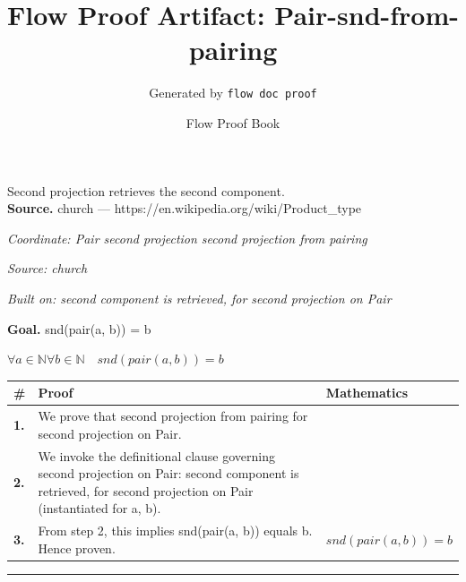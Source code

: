 \documentclass[11pt]{article}
\title{Flow Proof Artifact: Pair-snd-from-pairing}
\author{Generated by \texttt{flow doc proof}}
\date{Flow Proof Book}
\theoremstyle{definition}
\begin{document}
\maketitle
Second projection retrieves the second component.\\[0.5em]
\textbf{Source.} church — https://en.wikipedia.org/wiki/Product\_type\\[0.5em]
\bigskip
{}\par
\smallskip\noindent\textit{Coordinate: Pair \cdot second projection \cdot second projection from pairing}\par
\smallskip\noindent\textit{Source: church}\par
\smallskip\noindent\textit{Built on: second component is retrieved, for second projection on Pair}\par
\medskip
\noindent\textbf{Goal.} snd(pair(a, b)) = b\par
\noindent$\displaystyle \forall a \in \mathbb{N} \forall b \in \mathbb{N}\quad snd(pair(a, b)) = b$\par
\medskip
\noindent
\begin{tabular}{@{} >{\raggedright\arraybackslash}p{} >{\raggedright\arraybackslash}p{} >{\raggedleft\arraybackslash}p{} @{}}
\textbf{\#} & \textbf{Proof} & \textbf{Mathematics} \\
\midrule
\textbf{1.} & We prove that second projection from pairing for second projection on Pair. & \\[0.45em]
\textbf{2.} & We invoke the definitional clause governing second projection on Pair: second component is retrieved, for second projection on Pair (instantiated for a, b). & \\[0.45em]
\textbf{3.} & From step 2, this implies snd(pair(a, b)) equals b. Hence proven. & $\displaystyle snd(pair(a, b)) = b$ \\[0.45em]
\bottomrule
\end{tabular}
\label{thm:Pair-second projection-second_projection_from_pairing}
\par\medskip\hrule
\end{document}
